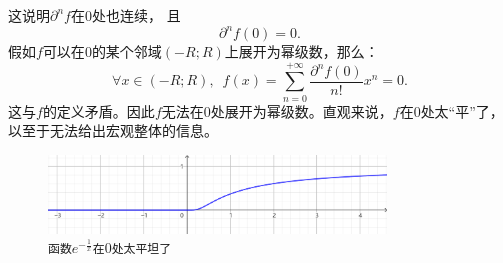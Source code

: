 \documentclass[12pt,UTF8]{ctexbook}
\theoremstyle{definition}
\theoremstyle{plain}
\newtheorem{sk}{思考}[section]
\begin{document}
\begin{appendix}
这说明$\partial^n f$在$0$处也连续，
且
$$ \partial^n f(0) = 0.$$
假如$f$可以在$0$的某个邻域$(-R;R)$上展开为幂级数，那么：
$$ \forall x \in (-R;R) ,\,\,\, f(x) = \sum_{n=0}^{+\infty} \frac{\partial^n f(0)}{n!} x^n = 0. $$
这与$f$的定义矛盾。因此$f$无法在$0$处展开为幂级数。直观来说，$f$在$0$处太“平”了，以至于无法给出宏观整体的信息。

\begin{figure}[h] %
    \centering
    \includegraphics[width=0.8\textwidth]{tu/幂级数2.png}
    \caption*{\texttt{函数}$\displaystyle e^{-\frac{1}{x}}$\texttt{在}$0$\texttt{处太平坦了}}
\end{figure}



\end{appendix}
\end{document}
